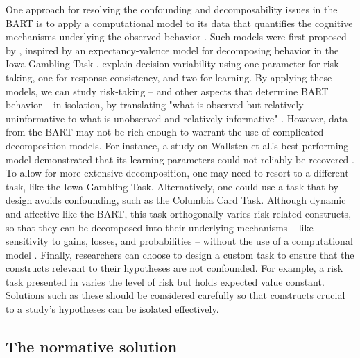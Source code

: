 \documentclass[serif, twocolumn, authordate, meta]{jote-article}
\begin{document}
One approach for resolving the confounding and decomposability issues in the BART is to apply a computational model to its data that quantifies the cognitive mechanisms underlying the observed behavior \parencite{Bishara2009}. Such models were first proposed by \textcite{Wallsten2005}, inspired by an expectancy-valence model for decomposing behavior in the Iowa Gambling Task \parencite{Busemeyer2002}.  \textcite{Wallsten2005} explain decision variability using one parameter for risk-taking, one for response consistency, and two for learning. By applying these models, we can study risk-taking -- and other aspects that determine BART behavior -- in isolation, by translating "what is observed but relatively uninformative to what is unobserved and relatively informative" \parencite[p. 95]{vanRavenzwaaij2011}. However, data from the BART may not be rich enough to warrant the use of complicated decomposition models. For instance, a study on Wallsten et al.'s best performing model demonstrated that its learning parameters could not reliably be recovered \parencite{vanRavenzwaaij2011}. To allow for more extensive decomposition, one may need to resort to a different task, like the Iowa Gambling Task. Alternatively, one could use a task that by design avoids confounding, such as the Columbia Card Task. Although dynamic and affective like the BART, this task orthogonally varies risk-related constructs, so that they can be decomposed into their underlying mechanisms -- like sensitivity to gains, losses, and probabilities -- without the use of a computational model \parencite{Dijkstra2020, Figner2009, Schonberg2011}. Finally, researchers can choose to design a custom task to ensure that the constructs relevant to their hypotheses are not confounded. For example, a risk task presented in \textcite{Schmidt2013} varies the level of risk but holds expected value constant. Solutions such as these should be considered carefully so that constructs crucial to a study's hypotheses can be isolated effectively.

{}
\subsection*{The normative solution}
\label{sec:normative}
\end{document}
